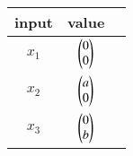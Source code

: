 \begin{tabular}[10pt]{ |c| c| c|}
    \hline
    \textbf{input} & \textbf{value}\\ 
    \hline
    $x_1$&$\begin{pmatrix}0\\0\end{pmatrix}$\\
    \hline 
    $x_2$&$\begin{pmatrix}a\\0\end{pmatrix}$\\
    \hline 
    $x_3$&$\begin{pmatrix}0\\b\end{pmatrix}$\\
    \hline
    \end{tabular}
